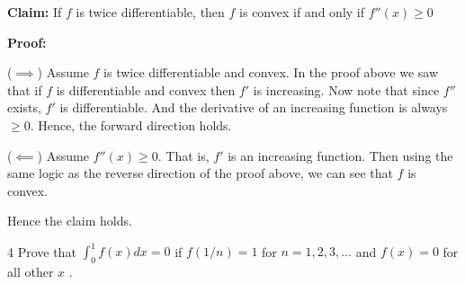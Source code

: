\documentclass[12pt]{article}
\begin{document}
\begin{solution}
        \bbni
        \textbf{Claim:} If $f$ is twice differentiable, then $f$ is convex if and only if $f''(x) \geq 0$
        
        \textbf{Proof:} 
        
        ($\implies$) Assume $f$ is twice differentiable and convex. In the proof above we saw that if $f$ is differentiable and convex then $f'$ is increasing. Now note that since $f''$ exists, $f'$ is differentiable. And the derivative of an increasing function  is always $\geq 0$. Hence, the forward direction holds. 

        ($\impliedby$) Assume $f''(x) \geq 0$. That is, $f'$ is an increasing function. Then using the same logic as the reverse direction of the proof above, we can see that $f$ is convex. 

        Hence the claim holds. 
\end{solution}

\newpage

\begin{problem}{4}
     Prove that $\int_0^1 f(x)dx = 0$ if $f(1/n) = 1$ for $n = 1,2,3,\ldots$ and $f(x) = 0$ for all other $x$ .
\end{problem}
\end{document}
